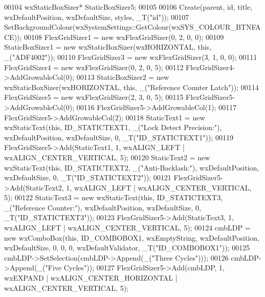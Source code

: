 \begin{DoxyCode}
00104     wxStaticBoxSizer* StaticBoxSizer5;
00105 
00106     Create(parent, \textcolor{keywordtype}{id}, title, wxDefaultPosition, wxDefaultSize, styles, \_T(\textcolor{stringliteral}{"id"}));
00107     SetBackgroundColour(wxSystemSettings::GetColour(wxSYS\_COLOUR\_BTNFACE));
00108     FlexGridSizer1 = \textcolor{keyword}{new} wxFlexGridSizer(0, 2, 0, 0);
00109     StaticBoxSizer1 = \textcolor{keyword}{new} wxStaticBoxSizer(wxHORIZONTAL, \textcolor{keyword}{this}, \_(\textcolor{stringliteral}{"ADF4002"}));
00110     FlexGridSizer3 = \textcolor{keyword}{new} wxFlexGridSizer(3, 1, 0, 0);
00111     FlexGridSizer4 = \textcolor{keyword}{new} wxFlexGridSizer(0, 2, 0, 5);
00112     FlexGridSizer4->AddGrowableCol(0);
00113     StaticBoxSizer2 = \textcolor{keyword}{new} wxStaticBoxSizer(wxHORIZONTAL, \textcolor{keyword}{this}, \_(\textcolor{stringliteral}{"Reference Counter Latch"}));
00114     FlexGridSizer5 = \textcolor{keyword}{new} wxFlexGridSizer(2, 3, 0, 5);
00115     FlexGridSizer5->AddGrowableCol(0);
00116     FlexGridSizer5->AddGrowableCol(1);
00117     FlexGridSizer5->AddGrowableCol(2);
00118     StaticText1 = \textcolor{keyword}{new} wxStaticText(\textcolor{keyword}{this}, ID\_STATICTEXT1, \_(\textcolor{stringliteral}{"Lock Detect Precision:"}), wxDefaultPosition, 
      wxDefaultSize, 0, \_T(\textcolor{stringliteral}{"ID\_STATICTEXT1"}));
00119     FlexGridSizer5->Add(StaticText1, 1, wxALIGN\_LEFT | wxALIGN\_CENTER\_VERTICAL, 5);
00120     StaticText2 = \textcolor{keyword}{new} wxStaticText(\textcolor{keyword}{this}, ID\_STATICTEXT2, \_(\textcolor{stringliteral}{"Anti-Backlash:"}), wxDefaultPosition, 
      wxDefaultSize, 0, \_T(\textcolor{stringliteral}{"ID\_STATICTEXT2"}));
00121     FlexGridSizer5->Add(StaticText2, 1, wxALIGN\_LEFT | wxALIGN\_CENTER\_VERTICAL, 5);
00122     StaticText3 = \textcolor{keyword}{new} wxStaticText(\textcolor{keyword}{this}, ID\_STATICTEXT3, \_(\textcolor{stringliteral}{"Reference Counter:"}), wxDefaultPosition, 
      wxDefaultSize, 0, \_T(\textcolor{stringliteral}{"ID\_STATICTEXT3"}));
00123     FlexGridSizer5->Add(StaticText3, 1, wxALIGN\_LEFT | wxALIGN\_CENTER\_VERTICAL, 5);
00124     cmbLDP = \textcolor{keyword}{new} wxComboBox(\textcolor{keyword}{this}, ID\_COMBOBOX1, wxEmptyString, wxDefaultPosition, wxDefaultSize, 0, 0, 0, 
      wxDefaultValidator, \_T(\textcolor{stringliteral}{"ID\_COMBOBOX1"}));
00125     cmbLDP->SetSelection(cmbLDP->Append(\_(\textcolor{stringliteral}{"Three Cycles"})));
00126     cmbLDP->Append(\_(\textcolor{stringliteral}{"Five Cycles"}));
00127     FlexGridSizer5->Add(cmbLDP, 1, wxEXPAND | wxALIGN\_CENTER\_HORIZONTAL | wxALIGN\_CENTER\_VERTICAL, 5);

\end{DoxyCode}
